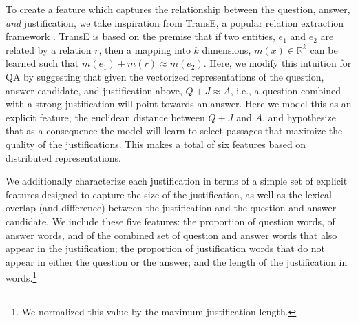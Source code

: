 To create a feature which captures the relationship between the question, answer, \emph{and} justification, we take inspiration from TransE, a popular relation extraction framework \citep{Bordes2013TranslatingEF}.  TransE is based on the premise that if two entities, $e_1$ and $e_2$ are related by a relation $r$, then a mapping into $k$ dimensions, $m(x) \in \mathbb{R}^k$ can be learned such that $m(e_1) + m(r) \approx m(e_2)$.  Here, we modify this intuition for QA by suggesting that given the vectorized representations of the question, answer candidate, and justification above, $Q + J \approx A$, i.e., a question combined with a strong justification will point towards an answer.  Here we model this as an explicit feature, the euclidean distance between $Q + J$ and $A$, and hypothesize that as a consequence the model will learn to select passages that maximize the quality of the justifications.
This makes a total of six features based on distributed representations. %

{} 
We additionally characterize each justification in terms of a simple set of explicit features designed to capture the size of the justification, as well as the lexical overlap (and difference) between the justification and the question and answer candidate.  We include these five features: the proportion of question words, of answer words, and of the combined set of question and answer words that also appear in the justification; the proportion of justification words that do not appear in either the question or the answer; and the length of the justification in words.\footnote{We normalized this value by the maximum justification length.} 


